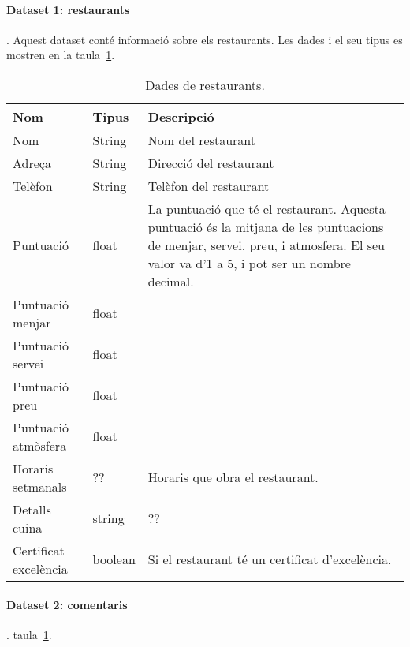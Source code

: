 \documentclass{article}
\begin{document}
\paragraph{Dataset 1: restaurants}. Aquest dataset conté informació sobre els
restaurants. Les dades i el seu tipus es mostren en la
taula~\ref{table:dataset1_data}.

\begin{table} %
    \begin{tabular}{|l|l|l|}
        Nom       & Tipus  & Descripció \\\hline\hline
        Nom       & String & Nom del restaurant \\\hline
        Adreça    & String & Direcció del restaurant \\\hline
        Telèfon   & String & Telèfon del restaurant \\\hline
        Puntuació & float  & La puntuació que té el restaurant. Aquesta
                             puntuació és la mitjana de les puntuacions de
                             menjar, servei, preu, i atmosfera. El seu valor
                             va d'1 a 5, i pot ser un nombre decimal. \\\hline
        Puntuació menjar & float & \\\hline
        Puntuació servei & float & \\\hline
        Puntuació preu & float & \\\hline
        Puntuació atmòsfera & float & \\\hline
        Horaris setmanals & ?? & Horaris que obra el restaurant. \\\hline
        Detalls cuina & string & ?? \\\hline
        Certificat excelència & boolean & Si el restaurant té un certificat
                                          d'excelència. \\\hline
    \end{tabular}
    \caption{Dades de restaurants.}
    \label{table:dataset1_data}
\end{table}

\paragraph{Dataset 2: comentaris}. %
taula~\ref{table:dataset1_data}.
\end{document}
